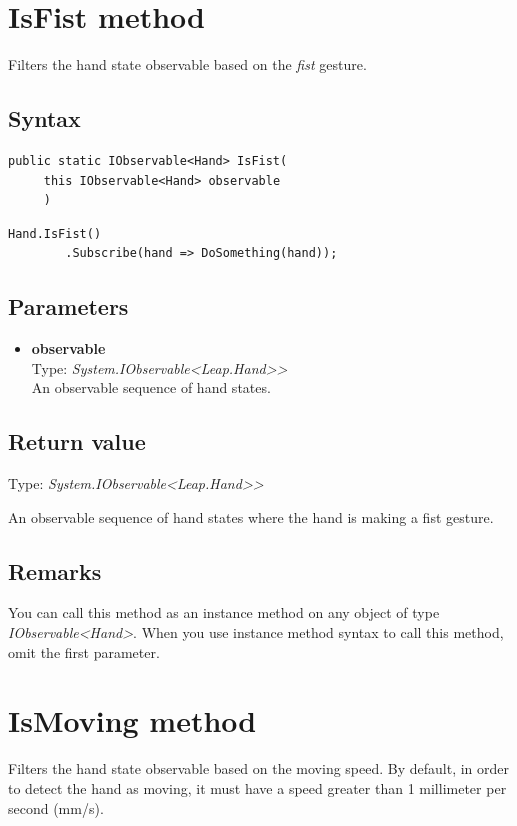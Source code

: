 \documentclass[12pt,a4paper,twoside]{report}
\begin{document}
\newpage

\section{IsFist method}
Filters the hand state observable based on the \textit{fist} gesture.

\subsection{Syntax}
\begin{lstlisting}[caption=Declaration]
    public static IObservable<Hand> IsFist(
     this IObservable<Hand> observable
     )
\end{lstlisting}

\begin{lstlisting}[caption=Usage example]
    Hand.IsFist()
        .Subscribe(hand => DoSomething(hand));
\end{lstlisting}

\subsection{Parameters}
\begin{itemize}
    \item \textbf{observable}\\
    Type: \textit{System.IObservable<Leap.Hand>{}>}\\
    An observable sequence of hand states.
\end{itemize}

\subsection{Return value}
Type: \textit{System.IObservable<Leap.Hand>{}>}

An observable sequence of hand states where the hand is making a fist gesture.

\subsection{Remarks}
You can call this method as an instance method on any object of type \textit{IObservable<Hand>}. When you use 
instance method syntax to call this method, omit the first parameter.

\newpage

\section{IsMoving method}
Filters the hand state observable based on the moving speed. By default, in order to detect the hand as moving, it must have a speed greater than 1 millimeter per second (mm/s).
\end{document}
